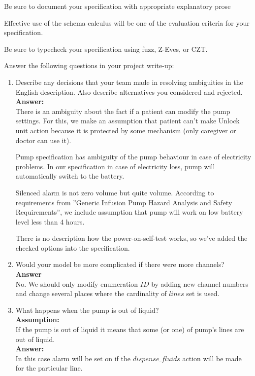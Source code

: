 \documentclass{article}
\begin{document}
\bigskip Be sure to document your specification with appropriate explanatory prose

\bigskip Effective use of the schema calculus will be one of the evaluation criteria for your specification.

\bigskip Be sure to typecheck your specification using fuzz,
Z-Eves, or CZT.

\bigskip Answer the following questions in your project write-up:
\begin{enumerate}
    \item Describe any decisions that your team made in resolving
    ambiguities in the English description. Also describe
    alternatives you considered and rejected.
    \\
    \textbf{Answer:}\\
    
   There is an ambiguity about the fact if a patient can modify the pump settings. For this, we make an assumption that patient can't make Unlock unit action because it is protected by some mechanism (only caregiver or doctor can use it).
    
    Pump specification has ambiguity of the pump behaviour in case of electricity problems. In our specification in case of electricity loss, pump will automatically switch to the battery.
    
    Silenced alarm is not zero volume but quite volume.
    According to requirements from ”Generic Infusion Pump Hazard Analysis and Safety Requirements”, we include assumption that pump will work on low battery level less than 4 hours.
    
	There is no description how the power-on-self-test works, so we've added the checked options into the specification.
 
    \item Would your model be more complicated if there were more
    channels?
    \\
    \textbf{Answer}\\
    No. We should only modify enumeration $ID$ by adding new channel numbers and change several places where the cardinality of $lines$ set is used.
    \item What happens when the pump is out of liquid?
    \\
    \textbf{Assumption:}\\
    If the pump is out of liquid it means that some (or one) of pump's lines are out of liquid.\\
    \textbf{Answer:}\\
    In this case alarm will be set on if the $dispense\_fluids$ action will be made for the particular line.
    

\end{enumerate}
\end{document}
